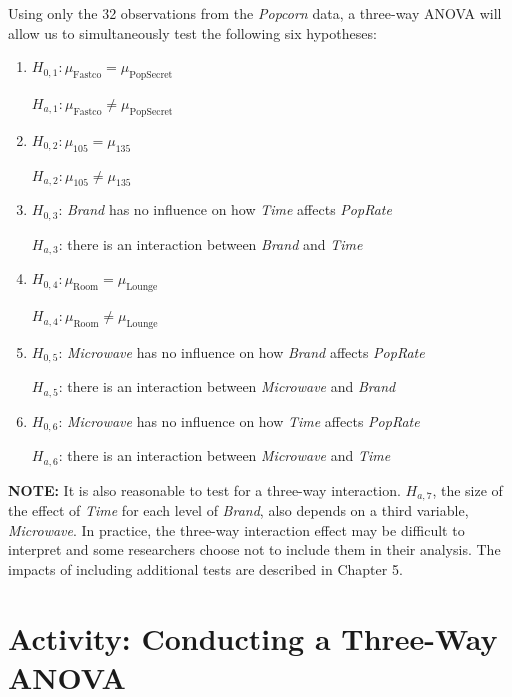\documentclass[
]{report}
\begin{document}
Using only the 32 observations from the \emph{Popcorn} data, a three-way ANOVA will allow us to simultaneously test the following six hypotheses:

\begin{enumerate}
\def\labelenumi{\arabic{enumi}.}
\item
  \(H_{0,1}: \mu_{\text{Fastco}} = \mu_{\text{PopSecret}}\)

  \(H_{a,1}: \mu_{\text{Fastco}} \ne \mu_{\text{PopSecret}}\)
\item
  \(H_{0,2}: \mu_{105} = \mu_{135}\)

  \(H_{a,2}: \mu_{105} \ne \mu_{135}\)
\item
  \(H_{0,3}\): \emph{Brand} has no influence on how \emph{Time} affects \emph{PopRate}

  \(H_{a,3}\): there is an interaction between \emph{Brand} and \emph{Time}
\item
  \(H_{0,4}: \mu_{\text{Room}} = \mu_{\text{Lounge}}\)

  \(H_{a,4}: \mu_{\text{Room}} \ne \mu_{\text{Lounge}}\)
\item
  \(H_{0,5}\): \emph{Microwave} has no influence on how \emph{Brand} affects \emph{PopRate}

  \(H_{a,5}\): there is an interaction between \emph{Microwave} and \emph{Brand}
\item
  \(H_{0,6}\): \emph{Microwave} has no influence on how \emph{Time} affects \emph{PopRate}

  \(H_{a,6}\): there is an interaction between \emph{Microwave} and \emph{Time}
\end{enumerate}

\large

\textbf{NOTE:}
It is also reasonable to test for a three-way interaction. \(H_{a,7}\), the size of the effect of \emph{Time} for each level of \emph{Brand}, also depends on a third variable, \emph{Microwave}. In practice, the three-way interaction effect may be difficult to interpret and some researchers choose not to include them in their analysis. The impacts of including additional tests are described in Chapter 5.
\normalsize

\hypertarget{activity-conducting-a-three-way-anova}{%
\section*{Activity: Conducting a Three-Way ANOVA}\label{activity-conducting-a-three-way-anova}}
\end{document}
